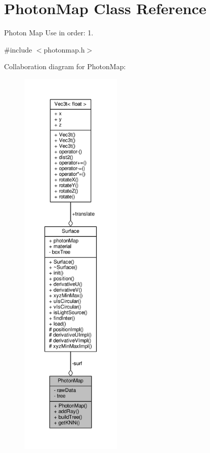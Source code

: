\hypertarget{classPhotonMap}{}\section{Photon\+Map Class Reference}
\label{classPhotonMap}


Photon Map Use in order\+: 1.  




{\ttfamily \#include $<$photonmap.\+h$>$}



Collaboration diagram for Photon\+Map\+:\nopagebreak
\begin{figure}[H]
\begin{center}
\leavevmode
\includegraphics[height=550pt]{classPhotonMap__coll__graph}
\end{center}
\end{figure}
